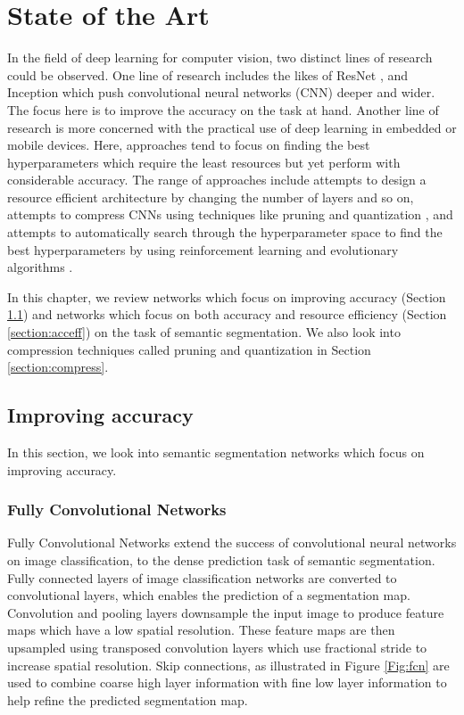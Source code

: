 
\chapter{State of the Art}

In the field of deep learning for computer vision, two distinct lines of research could be observed. One line of research includes the likes of ResNet \cite{DBLP:journals/corr/HeZRS15}, and Inception \cite{DBLP:journals/corr/SzegedyLJSRAEVR14} which push convolutional neural networks (CNN) deeper and wider. The focus here is to improve the accuracy on the task at hand. Another line of research is more concerned with the practical use of deep learning in embedded or mobile devices. Here, approaches tend to focus on finding the best hyperparameters which require the least resources but yet perform with considerable accuracy. The range of approaches include attempts to design a resource efficient architecture by changing the number of layers and so on, attempts to compress CNNs using techniques like pruning \cite{DBLP:journals/corr/MolchanovTKAK16} and quantization \cite{DBLP:journals/corr/WuLWHC15}, and attempts to automatically search through the hyperparameter space to find the best hyperparameters by using reinforcement learning \cite{DBLP:journals/corr/ZophL16} and evolutionary algorithms \cite{DBLP:journals/corr/abs-1802-01548}. 

In this chapter, we review networks which focus on improving accuracy (Section \ref{section:impacc}) and networks which focus on both accuracy and resource efficiency (Section \ref{section:acceff}) on the task of semantic segmentation. We also look into compression techniques called pruning and quantization in Section \ref{section:compress}.


\section{Improving accuracy}
\label{section:impacc}

In this section, we look into semantic segmentation networks which focus on improving accuracy. 

\subsection{Fully Convolutional Networks}

Fully Convolutional Networks \cite{DBLP:journals/corr/LongSD14} extend the success of convolutional neural networks on image classification, to the dense prediction task of semantic segmentation. Fully connected layers of image classification networks are converted to convolutional layers, which enables the prediction of a segmentation map. Convolution and pooling layers downsample the input image to produce feature maps which have a low spatial resolution. These feature maps are then upsampled using transposed convolution layers which use fractional stride to increase spatial resolution. Skip connections, as illustrated in Figure \ref{Fig:fcn} are used to combine coarse high layer information with fine low layer information to help refine the predicted segmentation map. 

